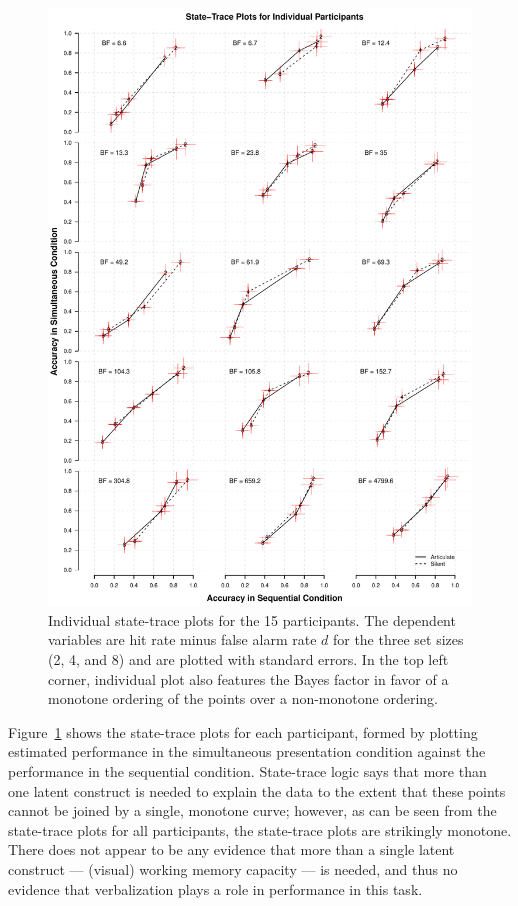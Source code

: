 \begin{figure}
 	\centering
	\includegraphics[width=\textwidth]{figures/grid_plot_v2}
	\caption{Individual state-trace plots for the 15 participants. The dependent variables are hit rate minus false alarm rate $d$ for the three set sizes (2, 4, and 8)  and are plotted with standard errors. In the top left corner, individual plot also features the Bayes factor in favor of a monotone ordering of the points over a non-monotone ordering.}

	\label{fig:ST_plots}
\end{figure}

Figure~\ref{fig:ST_plots} shows the state-trace plots for each participant, formed by plotting estimated performance in the simultaneous presentation condition against the performance in the sequential condition. State-trace logic says that more than one latent construct is needed to explain the data to the extent that these points cannot be joined by a single, monotone curve; however, as can be seen from the state-trace plots for all participants, the state-trace plots are strikingly monotone. There does not appear to be any evidence that more than a single latent construct --- (visual) working memory capacity --- is needed, and thus no evidence that verbalization plays a role in performance in this task.

